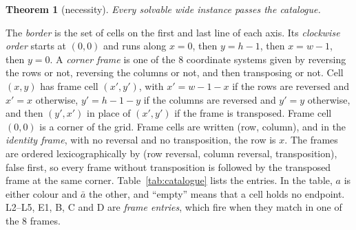 \documentclass[11pt]{article}
\newtheorem{theorem}{Theorem}
\newcommand{\ent}[1]{\textsf{#1}}
\begin{document}
\begin{theorem}[necessity]\label{thm:sound}
Every solvable wide instance passes the catalogue.
\end{theorem}

The \emph{border} is the set of cells on the first and last line of each axis. Its \emph{clockwise
order} starts at $(0,0)$ and runs along $x=0$, then $y=h-1$, then $x=w-1$, then $y=0$. A
\emph{corner frame} is one of the $8$ coordinate systems given by reversing the rows or not,
reversing the columns or not, and then transposing or not. Cell $(x,y)$ has frame cell $(x',y')$,
with $x'=w-1-x$ if the rows are reversed and $x'=x$ otherwise, $y'=h-1-y$ if the columns are
reversed and $y'=y$ otherwise, and then $(y',x')$ in place of $(x',y')$ if the frame is transposed.
Frame cell $(0,0)$ is a corner of the grid. Frame cells are written (row, column), and in the
\emph{identity frame}, with no reversal and no transposition, the row is $x$. The frames are ordered
lexicographically by (row reversal, column reversal, transposition), false first, so every frame
without transposition is followed by the transposed frame at the same corner.
Table~\ref{tab:catalogue} lists the entries. In the table, $a$ is either colour and $\bar a$ the other, and ``empty'' means that a cell holds no endpoint.
\ent{L2}--\ent{L5}, \ent{E1}, \ent{B}, \ent{C} and \ent{D} are \emph{frame entries}, which fire
when they match in one of the $8$ frames.
\end{document}
